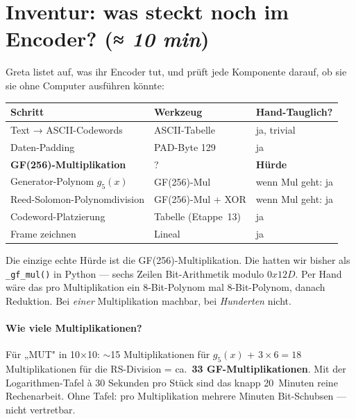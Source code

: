 \section{Inventur: was steckt noch im Encoder?
         \normalfont(\textit{≈ 10 min})}

Greta listet auf, was ihr Encoder tut, und prüft jede Komponente
darauf, ob sie sie ohne Computer ausführen könnte:

\begin{center}
\begin{tabular}{lll}
\toprule
\textbf{Schritt} & \textbf{Werkzeug} & \textbf{Hand-Tauglich?} \\
\midrule
Text → ASCII-Codewords         & ASCII-Tabelle    & ja, trivial \\
Daten-Padding                  & PAD-Byte 129     & ja \\
\textbf{GF(256)-Multiplikation} & ?                & \textbf{Hürde} \\
Generator-Polynom $g_5(x)$     & GF(256)-Mul      & wenn Mul geht: ja \\
Reed-Solomon-Polynomdivision   & GF(256)-Mul + XOR & wenn Mul geht: ja \\
Codeword-Platzierung           & Tabelle (Etappe~13) & ja \\
Frame zeichnen                 & Lineal           & ja \\
\bottomrule
\end{tabular}
\end{center}

Die einzige echte Hürde ist die GF(256)-Multiplikation. Die hatten
wir bisher als \texttt{\_gf\_mul()} in Python — sechs Zeilen Bit-Arithmetik
modulo $0x12D$. Per Hand wäre das pro Multiplikation ein 8-Bit-Polynom
mal 8-Bit-Polynom, danach Reduktion. Bei \emph{einer} Multiplikation
machbar, bei \emph{Hunderten} nicht.

\paragraph{Wie viele Multiplikationen?}
Für „MUT" in 10×10: $\sim$15 Multiplikationen für $g_5(x)$ + $3 \times 6 = 18$
Multiplikationen für die RS-Division = ca.\ \textbf{33 GF-Multiplikationen}.
Mit der Logarithmen-Tafel à 30 Sekunden pro Stück sind das knapp
20~Minuten reine Rechenarbeit. Ohne Tafel: pro Multiplikation
mehrere Minuten Bit-Schubsen — nicht vertretbar.

